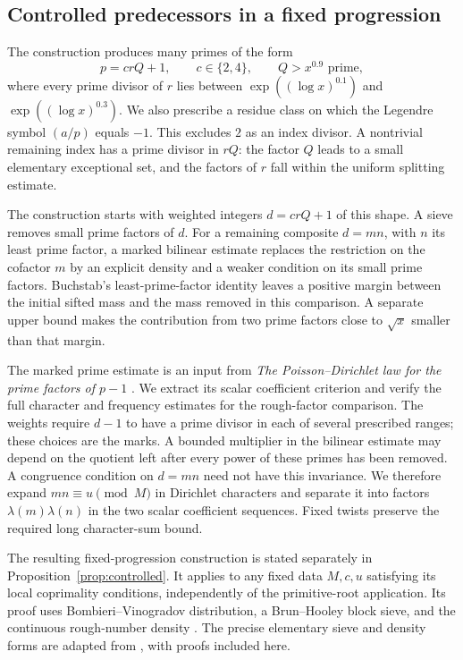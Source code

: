 \subsection{Controlled predecessors in a fixed progression}

The construction produces many primes of the form
\[
 p=crQ+1,\qquad c\in\{2,4\},\qquad Q>x^{0.9}\text{ prime},
\]
where every prime divisor of $r$ lies between
$\exp((\log x)^{0.1})$ and $\exp((\log x)^{0.3})$.
We also prescribe a residue class on which the Legendre symbol
$(a/p)$ equals $-1$. This excludes $2$ as an index divisor.
A nontrivial remaining index has a prime divisor in $rQ$:
the factor $Q$ leads to a small elementary exceptional set, and
the factors of $r$ fall within the uniform splitting estimate.

The construction starts with weighted integers $d=crQ+1$ of this
shape. A sieve removes small prime factors of $d$. For a remaining
composite $d=mn$, with $n$ its least prime factor, a marked bilinear
estimate replaces the restriction on the cofactor $m$ by an explicit
density and a weaker condition on its small prime factors.
Buchstab's least-prime-factor identity leaves a positive margin
between the initial sifted mass and the mass removed in this
comparison. A separate upper bound makes the contribution from two
prime factors close to $\sqrt x$ smaller than that margin.

The marked prime estimate is an input from
\emph{The Poisson--Dirichlet law for the prime factors of $p-1$}
\cite[Theorem~3.1]{PoissonDirichlet}. We extract its scalar coefficient
criterion and verify the full character and frequency estimates for
the rough-factor comparison. The weights require $d-1$ to have a
prime divisor in each of several prescribed ranges; these choices
are the marks. A bounded multiplier in the bilinear estimate may
depend on the quotient left after every power of these primes has
been removed. A congruence condition on $d=mn$ need not have this
invariance. We therefore expand $mn\equiv u\pmod M$ in Dirichlet
characters and separate it into factors $\lambda(m)\lambda(n)$
in the two scalar coefficient sequences. Fixed twists preserve
the required long character-sum bound.

The resulting fixed-progression construction is stated separately
in Proposition~\ref{prop:controlled}. It applies to any fixed data
$M,c,u$ satisfying its local coprimality conditions, independently
of the primitive-root application. Its proof uses
Bombieri--Vinogradov distribution, a Brun--Hooley block sieve,
and the continuous rough-number density
\cite{Bombieri65,Vinogradov65,FordHalberstam2000,Buchstab1937}.
The precise elementary sieve and density forms are adapted from
\cite[Lemmas~2.9 and~7.4]{BlockPaper}, with proofs included here.

